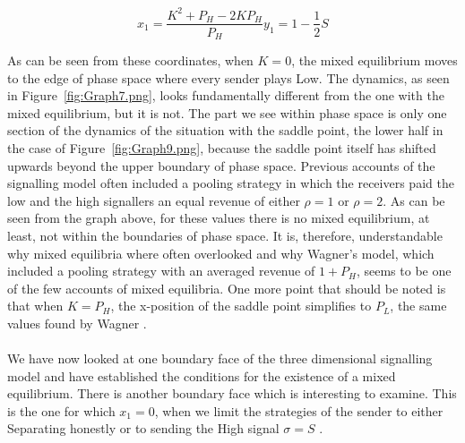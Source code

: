 \documentclass[a4paper,10pt]{article}
\numberwithin{equation}{section}
\begin{document}
\begin{subequations}
\label{eq:Position2D-1}
\begin{equation}
x_1=\frac{{K}^2+P_H-2 {K} P_H}{P_H}
\end{equation}
\begin{equation}
y_1=1-\frac{1}{2}S
\end{equation}
\end{subequations}

As can be seen from these coordinates, when $K=0$, the mixed equilibrium moves to the edge of phase space where every sender plays Low. The dynamics, as seen in Figure~\ref{fig:Graph7.png}, looks fundamentally different from the one with the mixed equilibrium, but it is not. The part we see within phase space is only one section of the dynamics of the situation with the saddle point, the lower half in the case of Figure~\ref{fig:Graph9.png}, because the saddle point itself has shifted upwards beyond the upper boundary of phase space. Previous accounts of the signalling model often included a pooling strategy in which the receivers paid the low and the high signallers an equal revenue of either $\rho=1$ or $\rho=2$. As can be seen from the graph above, for these values there is no mixed equilibrium, at least, not within the boundaries of phase space. It is, therefore, understandable why mixed equilibria where often overlooked and why Wagner's model, which included a pooling strategy with an averaged revenue of $1+P_H$, seems to be one of the few accounts of mixed equilibria. One more point that should be noted is that when $K=P_H$, the x-position of the saddle point simplifies to $P_L$, the same values found by Wagner \cite{Wagner2010}.\\
\\
We have now looked at one boundary face of the three dimensional signalling model and have established the conditions for the existence of a mixed equilibrium. There is another boundary face which is interesting to examine. This is the one for which $x_1=0$, when we limit the strategies of the sender to either Separating honestly or to sending the High signal $\sigma=S$ .
 
\end{document}
